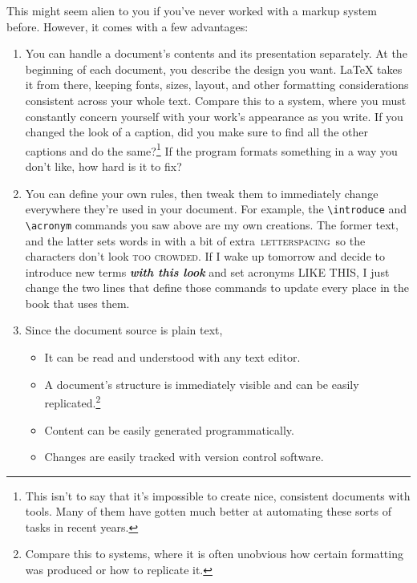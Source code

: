 This might seem alien to you if you've never worked with a markup system before.
However, it comes with a few advantages:
\begin{enumerate}
\item You can handle a document's contents and its presentation separately.
    At the beginning of each document,
    you describe the design you want.
    \LaTeX{} takes it from there,
    keeping fonts, sizes, layout,
    and other formatting considerations consistent across your
    whole text.
    Compare this to a  system,
    where you must constantly concern yourself with your work's appearance
    as you write.
    If you changed the look of a caption,
    did you make sure to find all the other captions and do the
    same?\footnote{This isn't to say that it's impossible
    to create nice, consistent documents with  tools.
    Many of them have gotten much better at automating these sorts of
    tasks in recent years.}
    If the program formats something in a way you don't like,
    how hard is it to fix?%

\item You can define your own rules, then tweak them to immediately change
    everywhere they're used in your document.
    For example, the \verb|\introduce| and \verb|\acronym| commands you saw above
    are my own creations. The former  text, and
    the latter sets words in  with a bit of extra
    \,\textsc{letterspacing}\, so the characters
    don't look \textsc{too crowded}.
    If I wake up tomorrow and decide to introduce new terms
    \textbf{\itshape with this look} and set acronyms
    {\small{} LIKE THIS},
    I just change the two lines that define those commands
    to update every place in the book that uses them.
\item Since the document source is plain text,
    \begin{itemize}
    \item It can be read and understood with any text editor.
    \item A document's structure is immediately visible
        and can be easily replicated.\footnote{Compare this to
         systems, where it is often unobvious
        how certain formatting was produced or how to replicate it.}
    \item Content can be easily generated programmatically.
    \item Changes are easily tracked with version control software.
    \end{itemize}
\end{enumerate}

